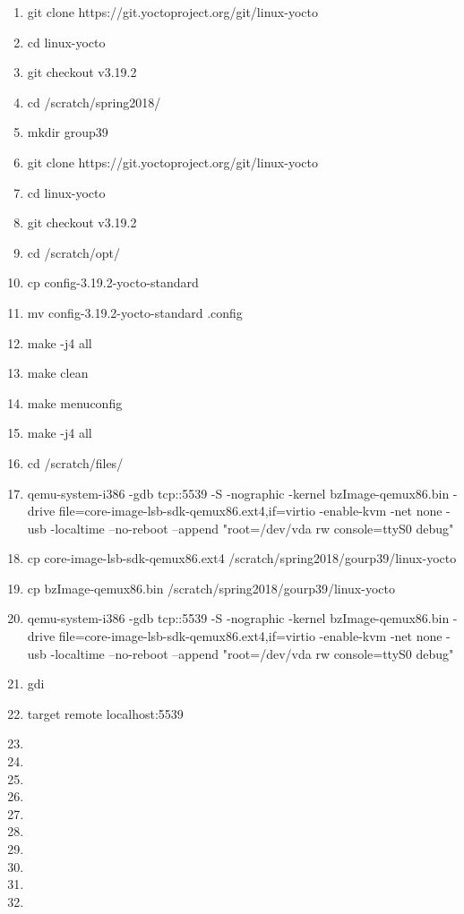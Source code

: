 \documentclass[10pt, letterpaper]{article}
\begin{document}
    \begin{enumerate}
        \item git clone https://git.yoctoproject.org/git/linux-yocto
        \item cd linux-yocto
        \item git checkout v3.19.2
        \item cd /scratch/spring2018/
        \item mkdir group39
        \item git clone https://git.yoctoproject.org/git/linux-yocto
        \item cd linux-yocto
        \item git checkout v3.19.2
        \item cd /scratch/opt/
        \item cp config-3.19.2-yocto-standard 
        \item mv config-3.19.2-yocto-standard .config 
        \item make -j4 all
        \item make clean
        \item make menuconfig
        \item make -j4 all
        \item cd /scratch/files/ 
        \item qemu-system-i386 -gdb tcp::5539 -S -nographic -kernel bzImage-qemux86.bin -drive file=core-image-lsb-sdk-qemux86.ext4,if=virtio -enable-kvm -net none -usb -localtime --no-reboot --append "root=/dev/vda rw console=ttyS0 debug"
        \item cp core-image-lsb-sdk-qemux86.ext4 /scratch/spring2018/gourp39/linux-yocto
        \item cp bzImage-qemux86.bin /scratch/spring2018/gourp39/linux-yocto
        \item qemu-system-i386 -gdb tcp::5539 -S -nographic -kernel bzImage-qemux86.bin -drive file=core-image-lsb-sdk-qemux86.ext4,if=virtio -enable-kvm -net none -usb -localtime --no-reboot --append "root=/dev/vda rw console=ttyS0 debug"
        \item gdi
        \item target remote localhost:5539
        \item
        \item
        \item
        \item
        \item
        \item
        \item
        \item
        \item
        \item
    \end{enumerate}
    
\end{document}

